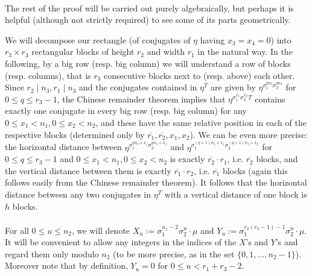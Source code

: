 \documentclass[12pt,a4paper]{article}
\theoremstyle{definition}
\newcommand{\uo}{\overline{r_2}}
\newcommand{\vo}{\overline{r_1}}
\begin{document}
\paragraph*{}
The rest of the proof will be carried out purely algebraically, but perhaps it is helpful (although not strictly required) to see some of its parts geometrically.

We will decompose our rectangle (of conjugates of $\eta$ having $x_3=x_4=0$) into $r_3\times r_3$ rectangular blocks of height $r_2$ and width $r_1$ in the natural way. In the following, by a big row (resp. big column) we will understand a row of blocks (resp. columns), that is $r_3$ consecutive blocks next to (resp. above) each other. Since $r_2\mid n_3, r_1\mid n_3$ and the conjugates contained in $\eta^T$ are given by $\eta^{\sigma_1^{qn_3}\sigma_2^{qn_3}}$ for $0\leq q \leq r_3-1$, the Chinese remainder theorem implies that $\eta^{\sigma_1^{x_1}\sigma_2^{x_2}T}$ contains exactly one conjugate in every big row (resp. big column) for any $0\leq x_1< n_1, 0\leq x_2< n_2$, and these have the same relative position in each of the respective blocks (determined only by $\vo,\uo,x_1,x_2$). We can be even more precise: the horizontal distance between $\eta^{\sigma_1^{qn_3+x_1}\sigma_2^{qn_3+x_2}}$ and $\eta^ {\sigma_1^{(q+1)n_3+x_1}\sigma_2^{(q+1)n_3+x_2}}$ for $0\leq q \leq r_3-1$ and $0\leq x_1< n_1, 0\leq x_2< n_2$ is exactly $\uo\cdot r_1$, i.e. $\uo$ blocks, and the vertical distance between them is exactly $\vo\cdot r_2$, i.e. $\vo$ blocks (again this follows easily from the Chinese remainder theorem). It follows that the horizontal distance between any two conjugates in $\eta^T$ with a vertical distance of one block is $h$ blocks.

\paragraph*{}
For all $0\leq u\leq n_2$, we will denote $X_u:=\sigma_1^{n_1-2}\sigma_2^{u}\cdot \mu$ and $Y_u:=\sigma_1^{r_2(r_3-1)-1}\sigma_2^u\cdot \mu$. It will be convenient to allow any integers in the indices of the $X$'s and $Y$'s and regard them only modulo $n_2$ (to be more precise, as in the set $\{0,1,\dots,n_2-1\}$). Moreover note that by definition, $Y_u=0$ for $0\leq u< r_1+r_3-2$. 
\end{document}
